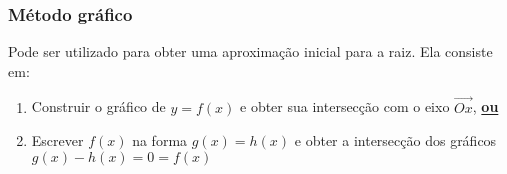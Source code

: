 \documentclass[a4paper,oneside,article,table]{article}
\begin{document}

        \subsubsection*{Método gráfico}
        Pode ser utilizado para obter uma aproximação inicial para a raiz. Ela consiste em:

        \begin{enumerate}
            \item Construir o gráfico de $y=f(x)$ e obter sua intersecção com o eixo $\vec{Ox}$, \textbf{\underline{ou}}
            \item Escrever $f(x)$ na forma $g(x) = h(x)$ e obter a intersecção dos gráficos $g(x) - h(x) = 0 = f(x)$
        \end{enumerate}
\end{document}
